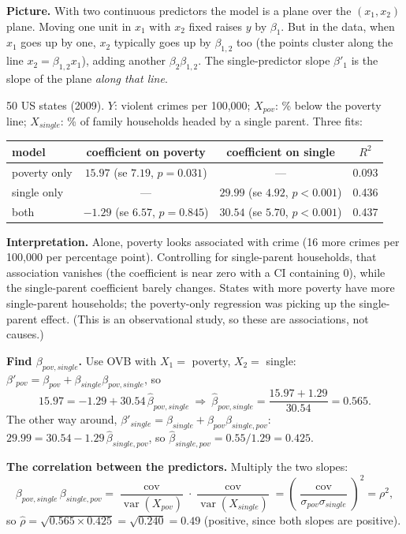 \documentclass[11pt]{article}
\newcommand{\Var}{\operatorname{var}}
\newcommand{\Cov}{\operatorname{cov}}
\begin{document}
\textbf{Picture.} With two continuous predictors the model is a plane over the $(x_1,x_2)$ plane. Moving one unit in $x_1$ with $x_2$ fixed raises
$y$ by $\beta_1$. But in the data, when $x_1$ goes up by one, $x_2$ typically goes up by $\beta_{1,2}$ too (the points cluster along the line
$x_2=\beta_{1,2}x_1$), adding another $\beta_2\beta_{1,2}$. The single-predictor slope $\beta'_1$ is the slope of the plane \emph{along that line}.

\begin{examplebox}[title={Question (10/14): poverty, single-parent households, and violent crime}]
50 US states (2009). $Y$: violent crimes per 100{,}000; $X_{pov}$: \% below the poverty line; $X_{single}$: \% of family households headed by a
single parent. Three fits:
\begin{center}
\begin{tabular}{lccc}
\toprule
model & coefficient on poverty & coefficient on single & $R^2$\\\midrule
poverty only & $15.97$ (se $7.19$, $p=0.031$) & --- & 0.093\\
single only & --- & $29.99$ (se $4.92$, $p<0.001$) & 0.436\\
both & $-1.29$ (se $6.57$, $p=0.845$) & $30.54$ (se $5.70$, $p<0.001$) & 0.437\\
\bottomrule
\end{tabular}
\end{center}
\textbf{Interpretation.} Alone, poverty looks associated with crime (16 more crimes per 100{,}000 per percentage point). Controlling for
single-parent households, that association vanishes (the coefficient is near zero with a CI containing 0), while the single-parent coefficient
barely changes. States with more poverty have more single-parent households; the poverty-only regression was picking up the single-parent effect.
(This is an observational study, so these are associations, not causes.)

\textbf{Find $\beta_{pov,single}$.} Use OVB with $X_1=$ poverty, $X_2=$ single: $\beta'_{pov}=\beta_{pov}+\beta_{single}\beta_{pov,single}$, so
\[
15.97=-1.29+30.54\,\hat\beta_{pov,single}\ \Longrightarrow\ \hat\beta_{pov,single}=\frac{15.97+1.29}{30.54}=0.565.
\]
The other way around, $\beta'_{single}=\beta_{single}+\beta_{pov}\beta_{single,pov}$: $29.99=30.54-1.29\,\hat\beta_{single,pov}$, so
$\hat\beta_{single,pov}=0.55/1.29=0.425$.

\textbf{The correlation between the predictors.} Multiply the two slopes:
\[
\beta_{pov,single}\,\beta_{single,pov}=\frac{\Cov}{\Var(X_{pov})}\cdot\frac{\Cov}{\Var(X_{single})}=\left(\frac{\Cov}{\sigma_{pov}\sigma_{single}}\right)^2=\rho^2,
\]
so $\hat\rho=\sqrt{0.565\times0.425}=\sqrt{0.240}=0.49$ (positive, since both slopes are positive).
\end{examplebox}
\end{document}
